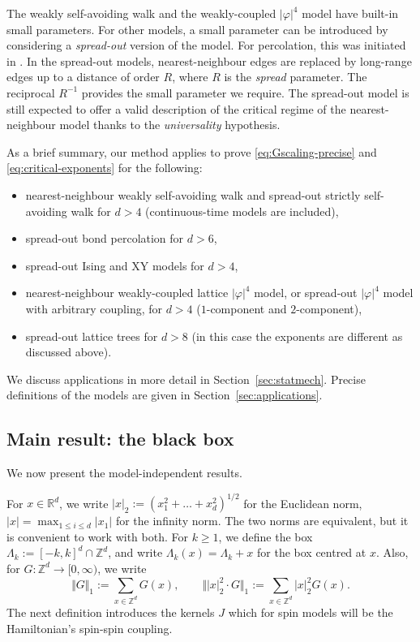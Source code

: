 \documentclass[11pt,a4paper]{article}
\numberwithin{equation}{section}
\theoremstyle{plain}
\theoremstyle{definition}
\newcommand\1{\mathds{1}}
\begin{document}
The weakly self-avoiding walk and the weakly-coupled $|\varphi|^4$ model
have built-in small parameters.  For other models, a small parameter can
be introduced by considering a \emph{spread-out} version of the model.
For percolation, this was initiated in \cite{HS90a}. In the spread-out models, nearest-neighbour edges are replaced by long-range
  edges up to a distance of order $R$, where $R$ is the \emph{spread} parameter. The reciprocal $R^{-1}$
  provides the small parameter we require.
  The spread-out model is still expected to offer a valid description of the critical regime of the nearest-neighbour model thanks to the \emph{universality} hypothesis.


As a brief summary, our method applies to prove \eqref{eq:Gscaling-precise}
and \eqref{eq:critical-exponents} for the following:
\begin{itemize}
\item
nearest-neighbour weakly self-avoiding walk
and spread-out strictly self-avoiding
walk for $d>4$
(continuous-time models are included),
\item
spread-out bond percolation for $d>6$,
\item
spread-out Ising and XY models for $d>4$,
\item
nearest-neighbour weakly-coupled lattice $|\varphi|^4$ model, or spread-out
$|\varphi|^4$ model with arbitrary coupling, for $d>4$
($1$-component and $2$-component),
\item
spread-out lattice trees for $d>8$ (in this case the exponents are different as discussed above).
\end{itemize}


We discuss applications in more detail in Section~\ref{sec:statmech}.
Precise definitions of the models are given in Section~\ref{sec:applications}.




\subsection{Main result: the black box}
\label{sec:blackbox}

We now present the model-independent results.

For $x\in \mathbb R^d$, we write $|x|_2:=(x_1^2+\ldots+x_d^2)^{1/2}$ for the   Euclidean norm, $|x|=\max_{1\le i\le d}|x_1|$ for the infinity norm.  The two norms are
equivalent, but it is convenient to work with both. For $k\geq 1$, we define the box $\Lambda_k:=[-k,k]^d\cap \mathbb Z^d$,
and write $\Lambda_k(x)=\Lambda_k +x$ for the box centred at $x$.
Also, for $G:\mathbb Z^d\rightarrow [0,\infty)$, we write
\begin{equation}\label{eq:def of function norms}
	\Vert G\Vert_1:=\sum_{x\in \mathbb Z^d}G(x), \qquad \Vert |x|_2^2\cdot G\Vert_1:=\sum_{x\in \mathbb Z^d}|x|_2^2 G(x).
\end{equation}
The next definition introduces the kernels $J$ which for spin models
will be the Hamiltonian's spin-spin coupling.
\end{document}
